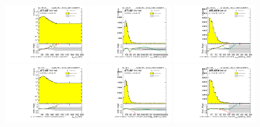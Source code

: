 \begin{figure}[htbp!]
\begin{center}
\includegraphics[angle=270, width=0.32\textwidth]{./figures/boosted/Reweight/Fits/Moriond_NoTag_3Trk_lead_Incl_sublHCand_Pt_m_1.pdf}
\includegraphics[angle=270, width=0.32\textwidth]{./figures/boosted/Reweight/Fits/Moriond_NoTag_3Trk_lead_Incl_sublHCand_trk0_Pt.pdf}
\includegraphics[angle=270, width=0.32\textwidth]{./figures/boosted/Reweight/Fits/Moriond_NoTag_3Trk_lead_Incl_sublHCand_trk1_Pt.pdf} \\
\includegraphics[angle=270, width=0.32\textwidth]{./figures/boosted/Reweight/Fits/Moriond_bkg_0_NoTag_3Trk_lead_Incl_sublHCand_Pt_m_1.pdf}
\includegraphics[angle=270, width=0.32\textwidth]{./figures/boosted/Reweight/Fits/Moriond_bkg_0_NoTag_3Trk_lead_Incl_sublHCand_trk0_Pt.pdf}
\includegraphics[angle=270, width=0.32\textwidth]{./figures/boosted/Reweight/Fits/Moriond_bkg_0_NoTag_3Trk_lead_Incl_sublHCand_trk1_Pt.pdf} \\

\end{center}
\end{figure}

